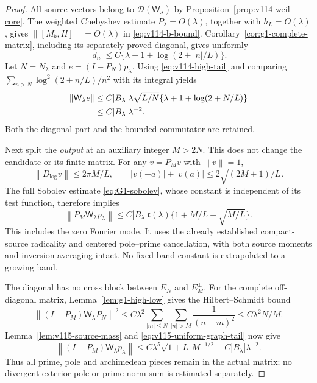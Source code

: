 \documentclass[11pt]{article}
\theoremstyle{remark}
\newcommand{\norm}[1]{\left\lVert #1\right\rVert}
\begin{document}
\begin{proof}
All source vectors belong to $\mathcal D(\mathsf W_\lambda)$ by
Proposition~\ref{prop:v114-weil-core}. The weighted Chebyshev estimate
$P_\lambda=O(\lambda)$, together with $h_L=O(\lambda)$, gives
$\norm{[M_b,H]}=O(\lambda)$ in \eqref{eq:v114-b-bound}.
Corollary~\ref{cor:g1-complete-matrix}, including its separately proved
diagonal, gives uniformly
\[
 |d_n|\le C\{\lambda+1+\log(2+|n|/L)\}.
\]
Let $N=N_\lambda$ and $e=(I-P_N)p_\lambda$.
Using \eqref{eq:v114-high-tail} and comparing
$\sum_{n>N}\log^2(2+n/L)/n^2$ with its integral yields
\begin{align}
 \norm{\mathsf W_\lambda e}
 &\le C|B_\lambda|\lambda\sqrt{L/N}
        \{\lambda+1+\log(2+N/L)\}\notag\\
 &\le C|B_\lambda|\lambda^{-2}.
 \label{eq:v115-uniform-graph-tail}
\end{align}
Both the diagonal part and the bounded commutator are retained.

Next split the \emph{output} at an auxiliary integer $M>2N$.
This does not change the candidate or its finite matrix. For any
$v=P_Mv$ with $\norm v=1$,
\[
 \norm{D_{\log}v}\le2\pi M/L,\qquad
 |v(-a)|+|v(a)|\le2\sqrt{(2M+1)/L}.
\]
The full Sobolev estimate \eqref{eq:G1-sobolev}, whose constant is
independent of its test function, therefore implies
\begin{equation}\label{eq:v115-low-output}
 \norm{P_M\mathsf W_\lambda p_\lambda}
 \le C|B_\lambda|\mathfrak r(\lambda)
       \{1+M/L+\sqrt{M/L}\}.
\end{equation}
This includes the zero Fourier mode. It uses the already established
compact-source radicality and centered pole--prime cancellation, with
both source moments and inversion averaging intact. No fixed-band
constant is extrapolated to a growing band.

The diagonal has no cross block between $E_N$ and $E_M^\perp$.
For the complete off-diagonal matrix, Lemma~\ref{lem:g1-high-low}
gives the Hilbert--Schmidt bound
\[
 \norm{(I-P_M)\mathsf W_\lambda P_N}^2
 \le C\lambda^2\sum_{|m|\le N}\sum_{|n|>M}\frac1{(n-m)^2}
 \le C\lambda^2N/M.
\]
Lemma~\ref{lem:v115-source-mass} and
\eqref{eq:v115-uniform-graph-tail} now give
\begin{equation}\label{eq:v115-high-output}
 \norm{(I-P_M)\mathsf W_\lambda p_\lambda}
 \le C\lambda^5\sqrt{1+L}\,M^{-1/2}
         +C|B_\lambda|\lambda^{-2}.
\end{equation}
Thus all prime, pole and archimedean pieces remain in the actual matrix;
no divergent exterior pole or prime norm sum is estimated separately.


\end{proof}
\end{document}
